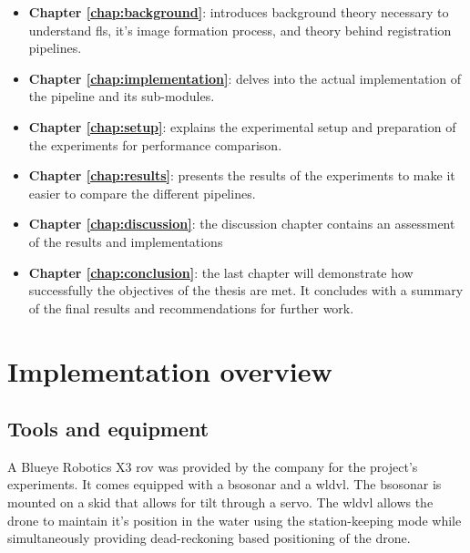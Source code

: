 \begin{itemize}
    \item \textbf{Chapter \ref{chap:background}}: introduces background theory necessary to understand \acrshort{fls}, it's image formation process, and theory behind registration pipelines.
    \item \textbf{Chapter \ref{chap:implementation}}: delves into the actual implementation of the pipeline and its sub-modules.
    \item \textbf{Chapter \ref{chap:setup}}: explains the experimental setup and preparation of the experiments for performance comparison.
    \item \textbf{Chapter \ref{chap:results}}: presents the results of the experiments to make it easier to compare the different pipelines.
    \item \textbf{Chapter \ref{chap:discussion}}: the discussion chapter contains an assessment of the results and implementations
    \item \textbf{Chapter \ref{chap:conclusion}}: the last chapter will demonstrate how successfully the objectives of the thesis are met. It concludes with a summary of the final results and recommendations for further work.
\end{itemize}

\section{Implementation overview}

\subsection{Tools and equipment}

A Blueye Robotics X3 \acrshort{rov} was provided by the company for the project's experiments. It comes equipped with a \acrfull{bsosonar} and a \acrfull{wldvl}. The \acrshort{bsosonar} is mounted on a skid that allows for tilt through a servo. The \acrshort{wldvl} allows the drone to maintain it's position in the water using the station-keeping mode while simultaneously providing dead-reckoning based positioning of the drone.

